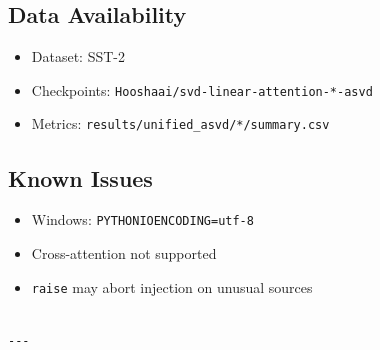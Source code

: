 \subsection{Data Availability}

\begin{itemize}
\item Dataset: SST-2
\item Checkpoints: \texttt{Hooshaai/svd-linear-attention-*-asvd}
\item Metrics: \texttt{results/unified\_asvd/*/summary.csv}

\end{itemize}
\subsection{Known Issues}

\begin{itemize}
\item Windows: \texttt{PYTHONIOENCODING=utf-8}
\item Cross-attention not supported
\item \texttt{raise} may abort injection on unusual sources
\end{itemize}
\begin{lstlisting}

---
\end{lstlisting}